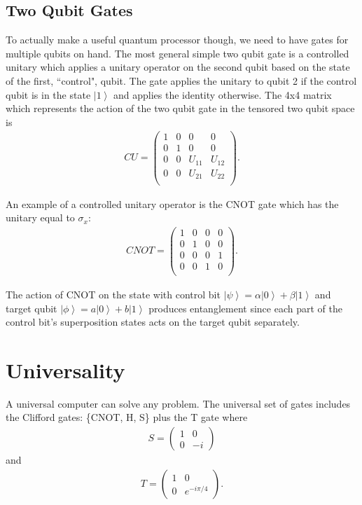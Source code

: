 \documentclass[11pt]{article} %
\newcommand{\ket}[1]{\left|#1\right\rangle}
\begin{document}
\subsection{Two Qubit Gates}
To actually make a useful quantum processor though, we need to have gates for multiple qubits on hand. The most general simple two qubit gate is a controlled unitary which applies a unitary operator on the second qubit based on the state of the first, ``control", qubit. The gate applies the unitary to qubit 2 if the control qubit is in the state $\ket{1}$ and applies the identity otherwise. The 4x4 matrix which represents the action of the two qubit gate in the tensored two qubit space is
\begin{align}
    CU = 
    \begin{pmatrix}
    1 & 0 & 0 & 0\\
    0 & 1 & 0 & 0\\
    0 & 0 & U_{11} & U_{12}\\
    0 & 0 & U_{21} & U_{22}\\
    \end{pmatrix}.
\end{align}

An example of a controlled unitary operator is the CNOT gate which has the unitary equal to $\sigma_x$:
\begin{align}
    CNOT = 
    \begin{pmatrix}
    1 & 0 & 0 & 0\\
    0 & 1 & 0 & 0\\
    0 & 0 & 0 & 1\\
    0 & 0 & 1 & 0\\
    \end{pmatrix}.
\end{align}

The action of CNOT on the state with control bit $\ket{\psi} = \alpha\ket{0}+ \beta\ket{1}$ and target qubit $\ket{\phi} = a\ket{0}+b\ket{1}$ produces entanglement since each part of the control bit's superposition states acts on the target qubit separately.

\section{Universality}
A universal computer can solve any problem. The universal set of gates includes the Clifford gates: \{CNOT, H, S\} plus the T gate where
\begin{align}
    S =
    \begin{pmatrix}
        1 & 0\\
        0 & -i
    \end{pmatrix}
\end{align}
and
\begin{align}
    T =
    \begin{pmatrix}
        1 & 0\\
        0 & e^{-i\pi/4}
    \end{pmatrix}.
\end{align}
\end{document}
